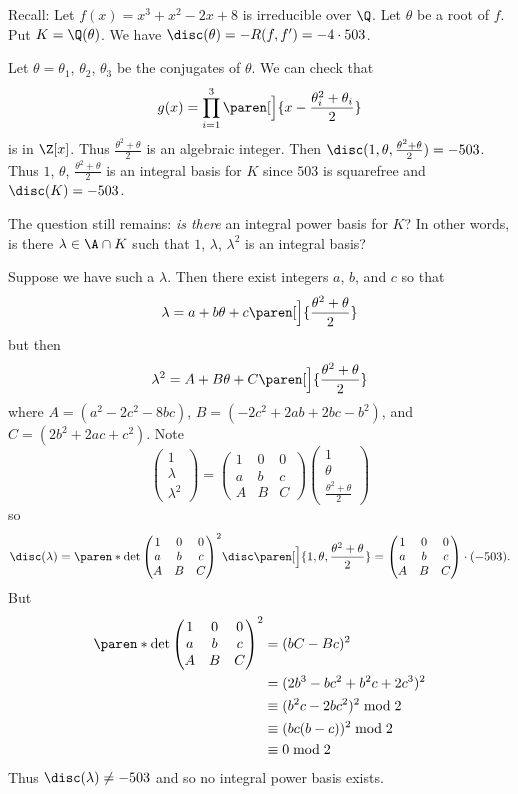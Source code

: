 Recall: Let $f(x)=x^3+x^2-2x+8$ is irreducible over $\Q$.  Let $\theta$ be a root of $f$.  Put $K=\Q(\theta)$.  We have $\disc(\theta)=-R(f,f')=-4\cdot503$.

Let $\theta=\theta_1$, $\theta_2$, $\theta_3$ be the conjugates of $\theta$.  We can check that
\[ g(x) = \prod_{i=1}^3\paren[\Big]{x-\frac{\theta_i^2+\theta_i}{2}} \]
is in $\Z[x]$.  Thus $\frac{\theta^2+\theta}{2}$ is an algebraic integer.  Then $\disc(1,\theta,\frac{\theta^2+\theta}{2})=-503$.  Thus $1$, $\theta$, $\frac{\theta^2+\theta}{2}$ is an integral basis for $K$ since $503$ is squarefree and $\disc(K)=-503$.

The question still remains: \emph{is there} an integral power basis for $K$?  In other words, is there $\lambda\in\A\cap K$ such that $1$, $\lambda$, $\lambda^2$ is an integral basis?

Suppose we have such a $\lambda$.  Then there exist integers $a$, $b$, and $c$ so that
\[ \lambda = a + b\theta + c\paren[\Big]{\frac{\theta^2+\theta}{2}} \]
but then
\[ \lambda^2 = A + B\theta + C\paren[\Big]{\frac{\theta^2+\theta}{2}} \]
where $A=(a^2-2c^2-8bc)$, $B=(-2c^2+2ab+2bc-b^2)$, and $C=(2b^2+2ac+c^2)$.  Note
\[ \begin{pmatrix}1\\
\lambda\\
\lambda^2
\end{pmatrix} = \begin{pmatrix}
1 & 0 & 0 \\
a & b & c \\
A & B & C
\end{pmatrix} \begin{pmatrix}
1 \\
\theta \\
\frac{\theta^2+\theta}{2}
\end{pmatrix} \]
so
\[ \disc(\lambda) = \paren*{\det\begin{pmatrix}
1&0&0\\
a&b&c\\
A&B&C
\end{pmatrix}}^2\disc\paren[\Big]{1,\theta,\frac{\theta^2+\theta}{2}} = \begin{pmatrix}
1&0&0\\
a&b&c\\
A&B&C
\end{pmatrix}\cdot(-503) . \]
But
\begin{align*}
\paren*{\det\begin{pmatrix}
1&0&0\\
a&b&c\\
A&B&C
\end{pmatrix}}^2 &= (bC-Bc)^2 \\
&= (2b^3-bc^2+b^2c+2c^3)^2 \\
&\equiv (b^2c-2bc^2)^2 \bmod 2 \\
&\equiv (bc(b-c))^2 \bmod 2 \\
&\equiv 0 \bmod 2
\end{align*}
Thus $\disc(\lambda)\neq-503$ and so no integral power basis exists.

